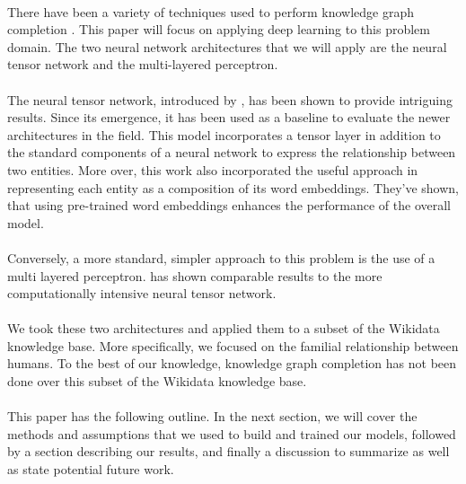 \documentclass[11.5pt]{article}
\begin{document}
\paragraph{} There have been a variety of techniques used to perform knowledge graph completion \cite{nickel2016review}. This paper will focus on applying deep learning to this problem domain. The two neural network architectures that we will apply are the neural tensor network and the multi-layered perceptron. 

\paragraph{} The neural tensor network, introduced by \cite{socher2013reasoning}, has been shown to provide intriguing results. Since its emergence, it has been used as a baseline to evaluate the newer architectures in the field. This model incorporates a tensor layer in addition to the standard components of a neural network to express the relationship between two entities. More over, this work also incorporated the useful approach in representing each entity as a composition of its word embeddings. They've shown, that using pre-trained word embeddings enhances the performance of the overall model.

\paragraph{}Conversely, a more standard, simpler approach to this problem is the use of a multi layered perceptron. \cite{dong2014knowledge} has shown comparable results to the more computationally intensive neural tensor network.

\paragraph{}We took these two architectures and applied them to a subset of the Wikidata knowledge base. More specifically, we focused on the familial relationship between humans. To the best of our knowledge, knowledge graph completion has not been done over this subset of the Wikidata knowledge base.

\paragraph{}This paper has the following outline. In the next section, we will cover the methods and assumptions that we used to build and trained our models, followed by a section describing our results, and finally a discussion  to summarize as well as state potential future work.
\end{document}
